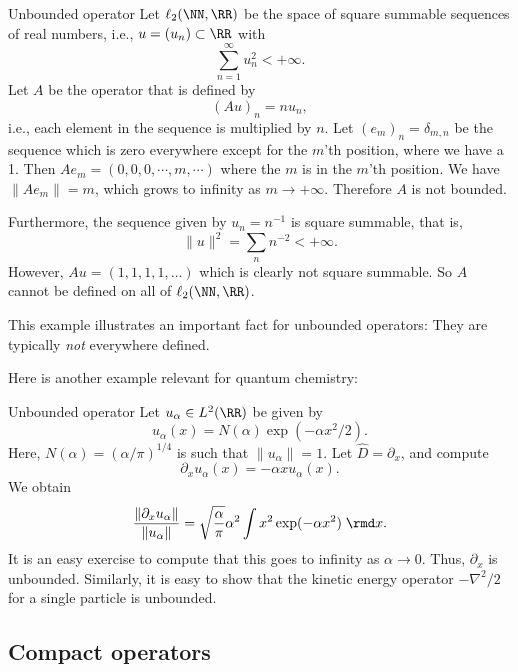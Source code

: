 \begin{myExample}{Unbounded operator}{}
    Let $\ell_2(\NN,\RR)$ be the space of square summable sequences of real numbers, i.e., $u = (u_n) \subset \RR$ with 
    \[ \sum_{n=1}^\infty u_n^2 < +\infty. \]
    Let $A$ be the operator that is defined by
    $$ (Au)_n = n u_n, $$
    i.e., each element in the sequence is multiplied by $n$. Let $(e_m)_n = \delta_{m,n}$ be the sequence which is zero everywhere except for the $m$'th position, where we have a 1. Then $Ae_m = (0,0,0,\cdots,m,\cdots)$ where the $m$ is in the $m$'th position. We have $\|A e_m\| = m$, which grows to infinity as $m\to+\infty$. Therefore $A$ is not bounded.

    Furthermore, 
    the sequence given by $u_n = n^{-1}$ is square summable, that is,
    $$ \| u \|^2 = \sum_n n^{-2} < +\infty. $$
    However, $Au = (1, 1, 1, 1, \dots)$ which is clearly not square summable. So $A$ cannot be defined on all of $\ell_2(\NN,\RR)$.
\end{myExample}

This example illustrates an important fact for unbounded operators: They are typically \emph{not} everywhere defined.

Here is another example relevant for quantum chemistry:

\begin{myExample}{Unbounded operator}{}
 Let $u_\alpha \in L^2(\RR)$ be given by
 \begin{equation}
     u_\alpha(x) = N(\alpha) \exp(-\alpha x^2/2).
 \end{equation}
    Here, $N(\alpha) = (\alpha/\pi)^{1/4}$ is such that $\|u_\alpha\|=1$.
Let $\hat{D} = \partial_x$, and compute
 \begin{equation}
    \partial_x u_\alpha(x) = -\alpha x u_\alpha(x).
 \end{equation}
 We obtain
 \begin{equation}
     \frac{\|\partial_x u_\alpha\|}{\|u_\alpha\|} = \sqrt{\frac{\alpha}{\pi}} \alpha^2 \int x^2 \exp(-\alpha x^2) \; \rmd x.
 \end{equation}
 It is an easy exercise to compute that this goes to infinity as $\alpha \to 0$. Thus, $\partial_x$ is unbounded.
 Similarly, it is easy to show that the kinetic energy operator $-\nabla^2/2$ for a single particle is unbounded.
\end{myExample}


\subsection{Compact operators}

